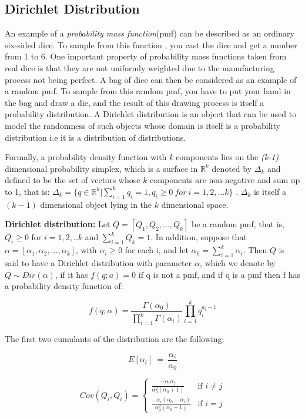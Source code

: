 \documentclass[twoside,hidelinks]{article}
\begin{document}
\subsection{Dirichlet Distribution}

An example of a \textit{probability mass function}(pmf) can be described as an ordinary six-sided dice. To sample from this function , you cast the dice and get a number from 1 to 6. One important property of probability mass functions taken from real dice is that they are not uniformly weighted due to the manufacturing process not being perfect. A bag of dice can then be considered as an example of a random pmf. To sample from this random pmf, you have to put your hand in the bag and draw a die, and the result of this drawing process is itself a probability distribution. A Dirichlet distribution is an object that can be used to model the randomness of such objects whose domain is itself is a probability distribution i.e it is a distribution of distributions.

Formally, a probability density function with \textit{k} components lies on the \textit{(k-1)} dimensional probability simplex, which is a surface in $ \mathbb{R}^k $ denoted by $ \Delta_k $ and defined to be the set of vectors whose $ k $  components are non-negative and sum up to 1, that is:  $ \Delta_k = \{ q \in  \mathbb{R}^k | \sum_{i=1}^k q_i=1, q_i \geq 0\ for\ i=1,2,...k \} $ . $ \Delta_k $  is itself a $ ( k-1 ) $ dimensional object lying in the $k$ dimensional space. 

\textbf{Dirichlet distribution:} Let $ Q = [Q_1,Q_2,...,Q_k  ] $ be a random pmf, that is, $ Q_i \geq 0 $ for $ i=1,2,..k $ and $ \sum_{i=1}^k Q_k=1 $. In addition, suppose that $ \alpha = [\alpha_1, \alpha_2, ..., \alpha_k ] $, with $ \alpha_i  \ge  0 $ for each i, and let $ \alpha_0 = \sum_{i=1}^k \alpha_i $. Then $ Q $ is said to have a Dirichlet distribution with parameter $\alpha$, which we denote by $ Q \sim  Dir(\alpha)$, if it has $f(q;a) = 0$ if q is not a pmf, and if q is a pmf then f has a probability density function of:

$$ f(q; \alpha) = \frac{ \Gamma( \alpha_0)  }{ \prod_{i=1}^{k} \Gamma ( \alpha_i) } \prod_{i=1}^{k} q_i^{a_i -1}$$

The first two cumulants of the distribution are the following:

$$ E[ \alpha_i]\ =\ \frac{ \alpha_i }{ \alpha_0 } $$

\[
 Cov(Q_i,Q_i) =
\left\{
	\begin{array}{ll}
		\frac{ - \alpha_i \alpha_j }{ \alpha_0^2 ( \alpha_0+1) }                   & \mbox{if } i \neq j  \\
		\frac{ - \alpha_i ( \alpha_0 - \alpha_i) }{ \alpha_0^2 ( \alpha_0+1)} & \mbox{if } i=j
	\end{array}
\right.
\]
\end{document}

